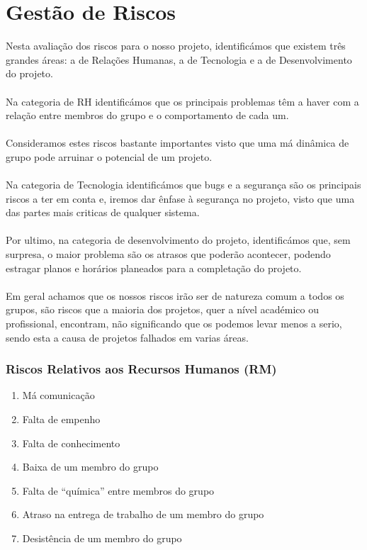\documentclass[12pt, a4paper, twoside]{report} %
\begin{document}


\section{Gestão de Riscos}

Nesta avaliação dos riscos para o nosso projeto, identificámos que existem três grandes áreas: a de Relações Humanas, a de Tecnologia e a de Desenvolvimento do projeto.\\\\ Na categoria de RH identificámos que os principais problemas têm a haver com a relação entre membros do grupo e o comportamento de cada um. \\\\Consideramos estes riscos bastante importantes visto que uma má dinâmica de grupo pode arruinar o potencial de um projeto.\\\\ Na categoria de Tecnologia identificámos que bugs e a segurança são os principais riscos a ter em conta e, iremos dar ênfase à segurança no projeto, visto que uma das partes mais criticas de qualquer sistema.\\\\ Por ultimo, na categoria de desenvolvimento do projeto, identificámos que, sem surpresa, o maior problema são os atrasos que poderão acontecer, podendo estragar planos e horários planeados para a completação do projeto.\\\\ Em geral achamos que os nossos riscos irão ser de natureza comum a todos os grupos, são riscos que a maioria dos projetos, quer a nível académico ou profissional, encontram, não significando que os podemos levar menos a serio, sendo esta a causa de projetos falhados em varias áreas.

\clearpage
\subsubsection{Riscos Relativos aos Recursos Humanos (RM)}
\begin{enumerate}
\item Má comunicação
\item Falta de empenho
\item Falta de conhecimento
\item Baixa de um membro do grupo
\item Falta de “química” entre membros do grupo
\item Atraso na entrega de trabalho de um membro do grupo
\item Desistência de um membro do grupo
\end{enumerate}
\end{document}
